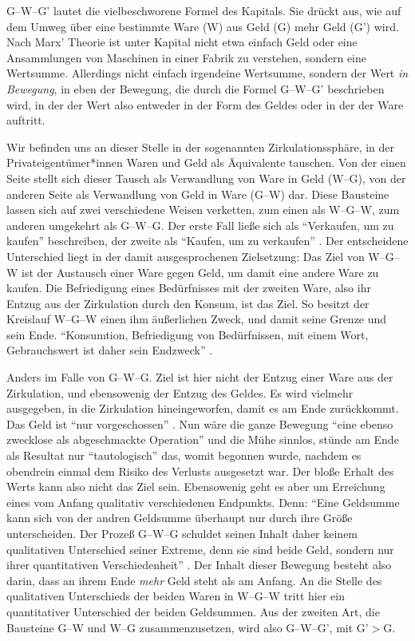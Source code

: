 \documentclass[12pt,
               DIV13,
               paper=a4,
               twoside=false,
               onehalfspacing,
               bibliography=totoc,
               toc=graduated,
               draft,
               ]{scrartcl}
\newcommand{\pc}[2]{\parencite[#1]{#2}}
\newcommand{\vgl}[2]{\parencite[vgl.][#1]{#2}}
\newcommand{\gwg}{G--W--G'\xspace}
\newcommand{\wgw}{W--G--W\xspace}
\begin{document}
\gwg lautet die vielbeschworene Formel des Kapitals. Sie drückt aus,
wie auf dem Umweg über eine bestimmte Ware (W) aus Geld (G) mehr Geld
(G') wird. Nach Marx' Theorie ist unter Kapital nicht etwa einfach
Geld oder eine Ansammlungen von Maschinen in einer Fabrik zu
verstehen, sondern eine Wertsumme. Allerdings nicht einfach irgendeine
Wertsumme, sondern der Wert \emph{in Bewegung}, in eben der Bewegung,
die durch die Formel \gwg beschrieben wird, in der der Wert also
entweder in der Form des Geldes oder in der der Ware auftritt.



Wir befinden uns an dieser Stelle in der sogenannten
Zirkulationssphäre, in der Privateigentümer*innen Waren und Geld als
Äquivalente tauschen. Von der einen Seite stellt sich dieser Tausch
als Verwandlung von Ware in Geld (W--G), von der anderen Seite als
Verwandlung von Geld in Ware (G--W) dar. Diese Bausteine lassen sich
auf zwei verschiedene Weisen verketten, zum einen als \wgw, zum
anderen umgekehrt als G--W--G. Der erste Fall ließe sich als
"`Verkaufen, um zu kaufen"' beschreiben, der zweite als "`Kaufen, um
zu verkaufen"' \vgl{162}{kap}. Der entscheidene Unterschied liegt in
der damit ausgesprochenen Zielsetzung: Das Ziel von \wgw ist der
Austausch einer Ware gegen Geld, um damit eine andere Ware zu kaufen.
Die Befriedigung eines Bedürfnisses mit der zweiten Ware, also ihr
Entzug aus der Zirkulation durch den Konsum, ist das Ziel. So besitzt
der Kreislauf \wgw einen ihm äußerlichen Zweck, und damit seine Grenze
und sein Ende. "`Konsumtion, Befriedigung von Bedürfnissen, mit einem
Wort, Gebrauchswert ist daher sein Endzweck"' \pc{164}{kap}.


Anders im Falle von G--W--G. Ziel ist hier nicht der Entzug einer Ware
aus der Zirkulation, und ebensowenig der Entzug des Geldes. Es wird
vielmehr ausgegeben, in die Zirkulation hineingeworfen, damit es am
Ende zurückkommt. Das Geld ist "`nur vorgeschossen"' \pc{163}{kap}.
Nun wäre die ganze Bewegung "`eine ebenso zwecklose als abgeschmackte
Operation"' \pc{165}{kap} und die Mühe sinnlos, stünde am Ende als
Resultat nur "`tautologisch"' \pc{164}{kap} das, womit begonnen wurde,
nachdem es obendrein einmal dem Risiko des Verlusts ausgesetzt war.
Der bloße Erhalt des Werts kann also nicht das Ziel sein. Ebensowenig
geht es aber um Erreichung eines vom Anfang qualitativ verschiedenen
Endpunkts. Denn: "`Eine Geldsumme kann sich von der andren Geldsumme
überhaupt nur durch ihre Größe unterscheiden. Der Prozeß G--W--G
schuldet seinen Inhalt daher keinem qualitativen Unterschied seiner
Extreme, denn sie sind beide Geld, sondern nur ihrer quantitativen
Verschiedenheit"' \pc{165}{kap}. Der Inhalt dieser Bewegung besteht
also darin, dass an ihrem Ende \emph{mehr} Geld steht als am Anfang.
An die Stelle des qualitativen Unterschieds der beiden Waren in \wgw
tritt hier ein quantitativer Unterschied der beiden Geldsummen. Aus
der zweiten Art, die Bausteine G--W und W--G zusammenzusetzen, wird
also \gwg, mit G'$>$G.
\end{document}
